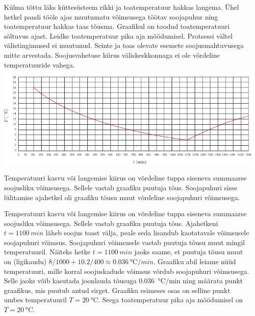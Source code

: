 
Külma tõttu läks küttesüsteem rikki ja toatemperatuur hakkas langema. Ühel hetkel pandi tööle ajas muutumatu võimsusega töötav soojapuhur ning toatemperatuur hakkas taas tõusma. Graafikul on toodud toatemperatuuri sõltuvus ajast. Leidke toatemperatuur pika aja möödumisel. Protsessi vältel välistingimused ei muutunud. Seinte ja toas olevate esemete soojusmahtuvusega mitte arvestada. Soojusvahetuse kiirus väliskeskkonnaga ei ole võrdeline temperatuuride vahega.

\begin{center}
	\includegraphics[width=\linewidth]{2006-v3g-07-yl}
\end{center}

\hint
Temperatuuri kasvu või langemise kiirus on võrdeline tuppa siseneva summaarse soojusliku võimsusega. Sellele vastab graafiku puutuja tõus. Soojapuhuri sisse lülitamise ajahetkel oli graafiku tõusu muut võrdeline soojapuhuri võimsusega.

\solu
Temperatuuri kasvu või langemise kiirus on võrdeline tuppa siseneva summaarse soojusliku võimsusega. Sellele vastab graafiku puutuja tõus. Ajahetkeni $t = \SI{1100}{min}$ läheb soojus toast välja, peale seda lisandub kaotatavale võimsusele soojapuhuri võimsus. Soojapuhuri võimsusele vastab puutuja tõusu muut mingil temperatuuril. Näiteks hetke $t = \SI{1100}{min}$ jaoks saame, et puutuja tõusu muut on (ligikaudu) $8/1000 + \num{10,2}/400 \approx \SI{0,036}{\degreeCelsius/min}$. Graafiku abil leiame nüüd temperatuuri, mille korral soojuskadude võimsus võrdub soojapuhuri võimsusega. Selle jaoks võib kasutada joonlauda tõusuga \SI{0,036}{\degreeCelsius/min} ning määrata punkt graafikus, mis puutub antud sirget. Graafiku esimeses osas on selline punkt umbes temperatuuril $T = \SI{20}{\degreeCelsius}$. Seega toatemperatuur pika aja möödumisel on $T = \SI{20}{\degreeCelsius}$.
\probend